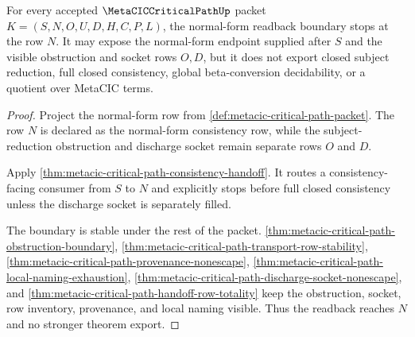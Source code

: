 \begin{theorem}
\label{thm:metacic-critical-path-normal-form-readback-boundary}
For every accepted $\MetaCICCriticalPathUp$ packet $K=(S,N,O,U,D,H,C,P,L)$, the normal-form readback boundary stops at the row $N$. It may expose the normal-form endpoint supplied after $S$ and the visible obstruction and socket rows $O,D$, but it does not export closed subject reduction, full closed consistency, global beta-conversion decidability, or a quotient over MetaCIC terms.
\end{theorem}
\begin{proof}
Project the normal-form row from \autoref{def:metacic-critical-path-packet}. The row $N$ is declared as the normal-form consistency row, while the subject-reduction obstruction and discharge socket remain separate rows $O$ and $D$.

Apply \autoref{thm:metacic-critical-path-consistency-handoff}. It routes a consistency-facing consumer from $S$ to $N$ and explicitly stops before full closed consistency unless the discharge socket is separately filled.

The boundary is stable under the rest of the packet. \autoref{thm:metacic-critical-path-obstruction-boundary}, \autoref{thm:metacic-critical-path-transport-row-stability}, \autoref{thm:metacic-critical-path-provenance-nonescape}, \autoref{thm:metacic-critical-path-local-naming-exhaustion}, \autoref{thm:metacic-critical-path-discharge-socket-nonescape}, and \autoref{thm:metacic-critical-path-handoff-row-totality} keep the obstruction, socket, row inventory, provenance, and local naming visible. Thus the readback reaches $N$ and no stronger theorem export.
\end{proof}



